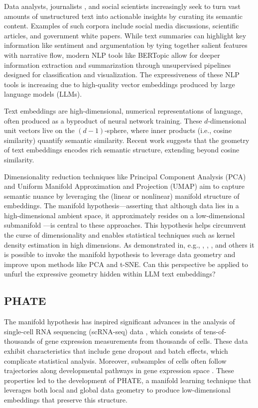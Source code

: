 Data analysts, journalists \cite{young2018makes}, and social scientists \cite{brugnone2024ought, benkler2024recognizing, friedman2024bottom} increasingly seek to turn vast amounts of unstructured text into actionable insights by curating its semantic content. Examples of such corpora include social media discussions, scientific articles, and government white papers. While text summaries can highlight key information like sentiment and argumentation by tying together salient features with narrative flow, modern NLP tools like BERTopic \cite{grootendorst2022bertopic} allow for deeper information extraction and summarization through unsupervised pipelines designed for classification and visualization. The expressiveness of these NLP tools is increasing due to high-quality vector embeddings produced by large language models (LLMs).

Text embeddings are high-dimensional, numerical representations of language, often produced as a byproduct of neural network training. These $d$-dimensional unit vectors live on the $(d-1)$-sphere, where inner products (i.e., cosine similarity) quantify semantic similarity. Recent work \cite{park2024the} suggests that the geometry of text embeddings encodes rich semantic structure, extending beyond cosine similarity.

Dimensionality reduction techniques like Principal Component Analysis (PCA) and Uniform Manifold Approximation and Projection (UMAP) \cite{mcinnes2018umap} aim to capture semantic nuance by leveraging the (linear or nonlinear) manifold structure of embeddings. The manifold hypothesis—asserting that although data lies in a high-dimensional ambient space, it approximately resides on a low-dimensional submanifold \cite{narayanan2010sample}—is central to these approaches. This hypothesis helps circumvent the curse of dimensionality and enables statistical techniques such as kernel density estimation in high dimensions. As demonstrated in, e.g., \citet{coifman2006diffusion}, \citet{moon2019visualizing}, \citet{haghverdi2015diffusion}, and others it is possible to invoke the manifold hypothesis to leverage data geometry and improve upon methods like PCA and t-SNE. Can this perspective be applied to unfurl the expressive geometry hidden within LLM text embeddings? 

\subsection{PHATE}
The manifold hypothesis has inspired significant advances in the analysis of single-cell RNA sequencing (scRNA-seq) data \cite{moon2019visualizing}, which consists of tens-of-thousands of gene expression measurements from thousands of cells. These data exhibit characteristics that include gene dropout and batch effects, which complicate statistical analysis. Moreover, subsamples of cells often follow trajectories along developmental pathways in gene expression space \cite{moon2019visualizing}. These properties led to the development of PHATE, a manifold learning technique that leverages both local and global data geometry to produce low-dimensional embeddings that preserve this structure.

